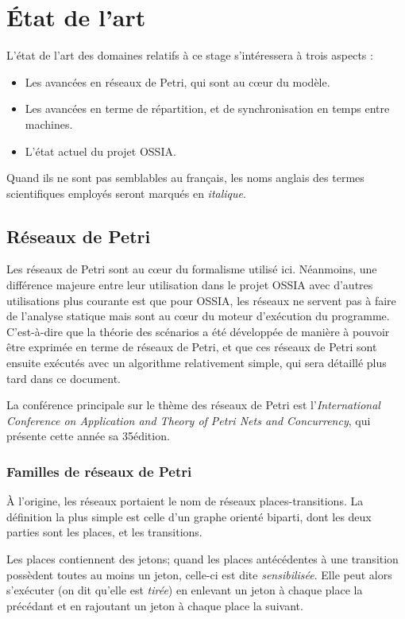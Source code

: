 \chapter{État de l'art}
L'état de l'art des domaines relatifs à ce stage s'intéressera à trois aspects : 
\begin{itemize}
	\item Les avancées en réseaux de Petri, qui sont au cœur du modèle.
	\item Les avancées en terme de répartition, et de synchronisation en temps entre machines.
	\item L'état actuel du projet \ac{OSSIA}. 
\end{itemize}

Quand ils ne sont pas semblables au français, les noms anglais des termes scientifiques employés seront marqués en \textit{italique}.

\section{Réseaux de Petri}
Les réseaux de Petri\cite{petri1962kommunikation} sont au cœur du formalisme utilisé ici. Néanmoins, une différence majeure entre leur utilisation dans le projet \ac{OSSIA} avec d'autres utilisations plus courante est que pour \ac{OSSIA}, les réseaux ne servent pas à faire de l'analyse statique mais sont au cœur du moteur d'exécution du programme. C'est-à-dire que la théorie des scénarios a été développée de manière à pouvoir être exprimée en terme de réseaux de Petri, et que ces réseaux de Petri sont ensuite exécutés avec un algorithme relativement simple, qui sera détaillé plus tard dans ce document.

La conférence principale sur le thème des réseaux de Petri est l'\textit{International Conference on Application and Theory of Petri Nets and Concurrency}, qui présente cette année sa 35\ieme édition.

\subsection{Familles de réseaux de Petri}
À l'origine, les réseaux portaient le nom de réseaux places-transitions. La définition la plus simple est celle d'un graphe orienté biparti, dont les deux parties sont les places, et les transitions.

Les places contiennent des jetons; quand les places antécédentes à une transition possèdent toutes au moins un jeton, celle-ci est dite \textit{sensibilisée}. Elle peut alors s'exécuter (on dit qu'elle est \textit{tirée}) en enlevant un jeton à chaque place la précédant et en rajoutant un jeton à chaque place la suivant.

